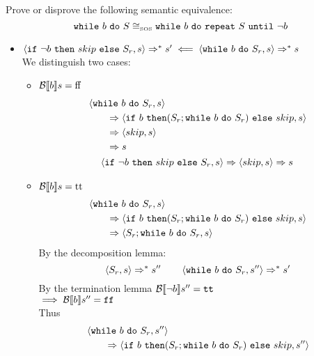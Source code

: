 \begin{exercise}{
    Prove or disprove the following semantic equivalence:
    \[ \texttt{while}\ b\ \texttt{do}\ S \cong_{\text{\tiny SOS}} \texttt{while}\ b\ \texttt{do}\ \texttt{repeat}\ S\ \texttt{until}\ \neg b  \]\vspace*{-0.6cm}
}
\begin{itemize}
\begin{itemize}
            \end{itemize}
        \item $\instr{\texttt{if}\ \neg b\ \texttt{then}\ skip\ \texttt{else}\ S_r}{s} \Rightarrow^* s' \impliedby \instr{\wwhile{b}{S}_r}{s} \Rightarrow^* s$ \\
            We distinguish two cases:\begin{itemize}
                \item $\mathcal{B} \llbracket  b \rrbracket s = \text{ff}$
                \begin{gather*}
                    \begin{align*}
                        &\instr{\wwhile{b}{S}_r}{s}
                        \\&\qquad\Rightarrow \instr{\texttt{if}\ b\ \texttt{then} (S_r; \wwhile{b}{S}_r)\ \texttt{else}\ skip}{s}
                        \\&\qquad\Rightarrow \instr{skip}{s}
                        \\&\qquad\Rightarrow s
                    \end{align*}
                    \\
                    \instr{\texttt{if}\ \neg b\ \texttt{then}\ skip\ \texttt{else}\ S_r}{s}
                    \Rightarrow
                    \instr{skip}{s}
                    \Rightarrow s
                \end{gather*}
                \item $\mathcal{B} \llbracket  b \rrbracket s = \text{tt}$
                \begin{align*}
                    &\instr{\wwhile{b}{S}_r}{s}
                    \\&\qquad\Rightarrow \instr{\texttt{if}\ b\ \texttt{then} (S_r; \wwhile{b}{S}_r)\ \texttt{else}\ skip}{s}
                    \\&\qquad\Rightarrow \instr{S_r; \wwhile{b}{S}_r}{s}
                \end{align*}
                By the decomposition lemma:
                \[ \left<S_r, s\right> \Rightarrow^* s'' \qquad \left<\texttt{while}\ b\ \texttt{do}\ S_r, s''\right> \Rightarrow^* s' \]
                By the termination lemma $\mathcal{B} \llbracket  \neg b \rrbracket s'' = \texttt{tt}$ \\
                $\implies \mathcal{B} \llbracket  b \rrbracket s'' = \texttt{ff}$ \\
                Thus
                \begin{align*}
                    &\instr{\wwhile{b}{S}_r}{s''}
                    \\&\qquad\Rightarrow \instr{\texttt{if}\ b\ \texttt{then} (S_r; \wwhile{b}{S}_r)\ \texttt{else}\ skip}{s''}

\end{align*}
\end{itemize}
\end{itemize}
\end{exercise}
